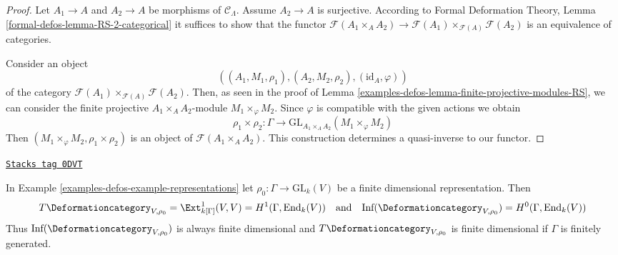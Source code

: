 \begin{proof}
Let $A_1 \to A$ and $A_2 \to A$ be morphisms of $\mathcal{C}_\Lambda$.
Assume $A_2 \to A$ is surjective. According to
Formal Deformation Theory, Lemma
\ref{formal-defos-lemma-RS-2-categorical}
it suffices to show that the functor
$\mathcal{F}(A_1 \times_A A_2) \to
\mathcal{F}(A_1) \times_{\mathcal{F}(A)} \mathcal{F}(A_2)$
is an equivalence of categories.

\medskip\noindent
Consider an object
$$
((A_1, M_1, \rho_1), (A_2, M_2, \rho_2), (\text{id}_A, \varphi))
$$
of the category $\mathcal{F}(A_1) \times_{\mathcal{F}(A)} \mathcal{F}(A_2)$.
Then, as seen in the proof of Lemma \ref{examples-defos-lemma-finite-projective-modules-RS},
we can consider the finite projective
$A_1 \times_A A_2$-module $M_1 \times_\varphi M_2$.
Since $\varphi$ is compatible with the given actions we obtain
$$
\rho_1 \times \rho_2 : \Gamma \longrightarrow
\text{GL}_{A_1 \times_A A_2}(M_1 \times_\varphi M_2)
$$
Then $(M_1 \times_\varphi M_2, \rho_1 \times \rho_2)$
is an object of $\mathcal{F}(A_1 \times_A A_2)$.
This construction determines a quasi-inverse to our functor.
\end{proof}

\begin{lemma}[Representations TI]
\label{examples-defos-lemma-representations-TI}
\href{https://stacks.math.columbia.edu/tag/0DVT}{\texttt{Stacks tag 0DVT}}

In Example \ref{examples-defos-example-representations} let
$\rho_0 : \Gamma \to \text{GL}_k(V)$
be a finite dimensional representation. Then
$$
T\Deformationcategory_{V, \rho_0} = \Ext^1_{k[\Gamma]}(V, V) =
H^1(\Gamma, \text{End}_k(V))
\quad\text{and}\quad
\text{Inf}(\Deformationcategory_{V, \rho_0}) = H^0(\Gamma, \text{End}_k(V))
$$
Thus $\text{Inf}(\Deformationcategory_{V, \rho_0})$
is always finite dimensional
and $T\Deformationcategory_{V, \rho_0}$ is finite dimensional
if $\Gamma$ is finitely generated.
\end{lemma}


